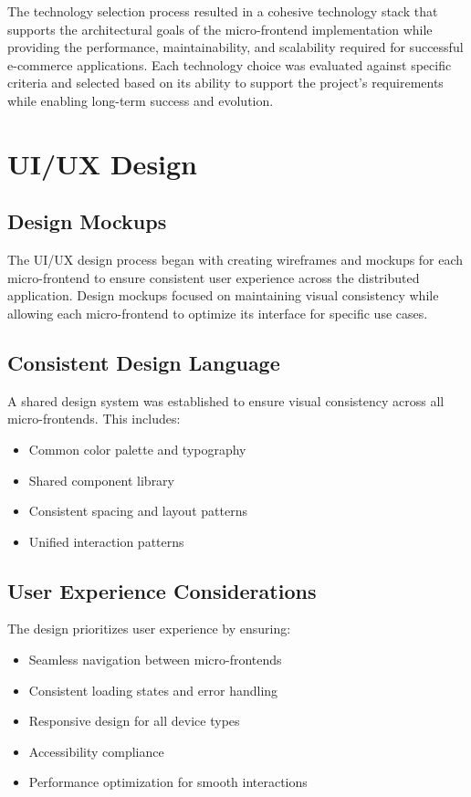 \documentclass[12pt,a4paper]{report}
\begin{document}
The technology selection process resulted in a cohesive technology stack that supports the architectural goals of the micro-frontend implementation while providing the performance, maintainability, and scalability required for successful e-commerce applications. Each technology choice was evaluated against specific criteria and selected based on its ability to support the project's requirements while enabling long-term success and evolution.

\section{UI/UX Design}
\subsection{Design Mockups}

The UI/UX design process began with creating wireframes and mockups for each micro-frontend to ensure consistent user experience across the distributed application. Design mockups focused on maintaining visual consistency while allowing each micro-frontend to optimize its interface for specific use cases.

\subsection{Consistent Design Language}

A shared design system was established to ensure visual consistency across all micro-frontends. This includes:
\begin{itemize}
    \item Common color palette and typography
    \item Shared component library
    \item Consistent spacing and layout patterns
    \item Unified interaction patterns
\end{itemize}

\subsection{User Experience Considerations}

The design prioritizes user experience by ensuring:
\begin{itemize}
    \item Seamless navigation between micro-frontends
    \item Consistent loading states and error handling
    \item Responsive design for all device types
    \item Accessibility compliance
    \item Performance optimization for smooth interactions
\end{itemize}
\end{document}
